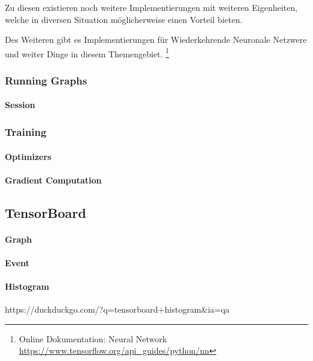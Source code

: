 \noindent
Zu diesen existieren noch weitere Implementierungen mit weiteren Eigenheiten, welche in diversen Situation möglicherweise einen Vorteil bieten. 


\noindent
Des Weiteren gibt es Implementierungen für Wiederkehrende Neuronale Netzwere und weiter Dinge in diesem Themengebiet. 
\footnote{Online Dokumentation: Neural Network \url{https://www.tensorflow.org/api_guides/python/nn}}

\subsubsection{Running Graphs}

\paragraph{Session}

\subsubsection{Training}

\paragraph{Optimizers}

\paragraph{Gradient Computation}



\subsection{TensorBoard}

\paragraph{Graph}
\paragraph{Event}
\paragraph{Histogram} https://duckduckgo.com/?q=tensorboard+histogram&ia=qa